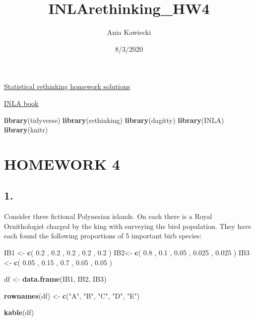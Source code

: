 \documentclass[
]{article}
\title{INLArethinking\_HW4}
\author{Ania Kawiecki}
\date{8/3/2020}
\newenvironment{Shaded}{\begin{snugshade}}{\end{snugshade}}
\newcommand{\FloatTok}[1]{\textcolor[rgb]{0.00,0.00,0.81}{#1}}
\newcommand{\KeywordTok}[1]{\textcolor[rgb]{0.13,0.29,0.53}{\textbf{#1}}}
\newcommand{\NormalTok}[1]{#1}
\newcommand{\StringTok}[1]{\textcolor[rgb]{0.31,0.60,0.02}{#1}}
\begin{document}
\maketitle

\href{https://github.com/rmcelreath/statrethinking_winter2019/tree/master/homework}{Statistical
rethinking homework solutions}

\href{https://becarioprecario.bitbucket.io/inla-gitbook/ch-intro.html}{INLA
book}

\begin{Shaded}
\begin{Highlighting}[]
\KeywordTok{library}\NormalTok{(tidyverse)}
\KeywordTok{library}\NormalTok{(rethinking)}
\KeywordTok{library}\NormalTok{(dagitty)}
\KeywordTok{library}\NormalTok{(INLA)}
\KeywordTok{library}\NormalTok{(knitr)}
\end{Highlighting}
\end{Shaded}

\hypertarget{homework-4}{%
\section{HOMEWORK 4}\label{homework-4}}

\hypertarget{section}{%
\subsection{1.}\label{section}}

Consider three fictional Polynesian islands. On each there is a Royal
Ornithologist charged by the king with surveying the bird population.
They have each found the following proportions of 5 important birb
species:

\begin{Shaded}
\begin{Highlighting}[]
\NormalTok{IB1 <-}\StringTok{ }\KeywordTok{c}\NormalTok{( }\FloatTok{0.2}\NormalTok{ , }\FloatTok{0.2}\NormalTok{ , }\FloatTok{0.2}\NormalTok{ , }\FloatTok{0.2}\NormalTok{ , }\FloatTok{0.2}\NormalTok{ )}
\NormalTok{IB2<-}\StringTok{ }\KeywordTok{c}\NormalTok{( }\FloatTok{0.8}\NormalTok{ , }\FloatTok{0.1}\NormalTok{ , }\FloatTok{0.05}\NormalTok{ , }\FloatTok{0.025}\NormalTok{ , }\FloatTok{0.025}\NormalTok{ )}
\NormalTok{IB3 <-}\StringTok{ }\KeywordTok{c}\NormalTok{( }\FloatTok{0.05}\NormalTok{ , }\FloatTok{0.15}\NormalTok{ , }\FloatTok{0.7}\NormalTok{ , }\FloatTok{0.05}\NormalTok{ , }\FloatTok{0.05}\NormalTok{ )}

\NormalTok{df <-}\StringTok{ }\KeywordTok{data.frame}\NormalTok{(IB1, IB2, IB3)}

\KeywordTok{rownames}\NormalTok{(df) <-}\StringTok{ }\KeywordTok{c}\NormalTok{(}\StringTok{"A"}\NormalTok{, }\StringTok{"B"}\NormalTok{, }\StringTok{"C"}\NormalTok{, }\StringTok{"D"}\NormalTok{, }\StringTok{"E"}\NormalTok{)}

\KeywordTok{kable}\NormalTok{(df)}
\end{Highlighting}
\end{Shaded}
\end{document}
